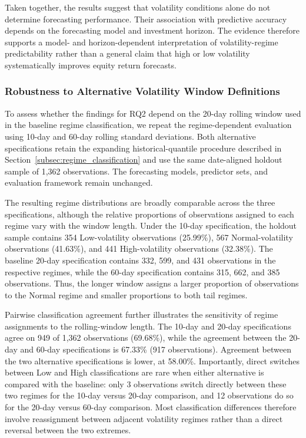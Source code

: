 \documentclass[12pt,twoside]{ord}
\begin{document}
Taken together, the results suggest that volatility conditions alone do not determine forecasting performance. Their association with predictive accuracy depends on the forecasting model and investment horizon. The evidence therefore supports a model- and horizon-dependent interpretation of volatility-regime predictability rather than a general claim that high or low volatility systematically improves equity return forecasts.

\subsubsection{Robustness to Alternative Volatility Window Definitions}\label{subsec:volatility_robustness}

To assess whether the findings for RQ2 depend on the 20-day rolling window used in the baseline regime classification, we repeat the regime-dependent evaluation using 10-day and 60-day rolling standard deviations. Both alternative specifications retain the expanding historical-quantile procedure described in Section~\ref{subsec:regime_classification} and use the same date-aligned holdout sample of 1,362 observations. The forecasting models, predictor sets, and evaluation framework remain unchanged.

The resulting regime distributions are broadly comparable across the three specifications, although the relative proportions of observations assigned to each regime vary with the window length. Under the 10-day specification, the holdout sample contains 354 Low-volatility observations (25.99\%), 567 Normal-volatility observations (41.63\%), and 441 High-volatility observations (32.38\%). The baseline 20-day specification contains 332, 599, and 431 observations in the respective regimes, while the 60-day specification contains 315, 662, and 385 observations. Thus, the longer window assigns a larger proportion of observations to the Normal regime and smaller proportions to both tail regimes.

Pairwise classification agreement further illustrates the sensitivity of regime assignments to the rolling-window length. The 10-day and 20-day specifications agree on 949 of 1,362 observations (69.68\%), while the agreement between the 20-day and 60-day specifications is 67.33\% (917 observations). Agreement between the two alternative specifications is lower, at 58.00\%. Importantly, direct switches between Low and High classifications are rare when either alternative is compared with the baseline: only 3 observations switch directly between these two regimes for the 10-day versus 20-day comparison, and 12 observations do so for the 20-day versus 60-day comparison. Most classification differences therefore involve reassignment between adjacent volatility regimes rather than a direct reversal between the two extremes.
\end{document}
